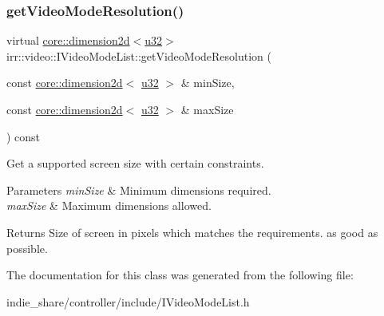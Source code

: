\subsubsection{\texorpdfstring{get\+Video\+Mode\+Resolution()}{getVideoModeResolution()}\hspace{0.1cm}{\footnotesize\ttfamily [4/4]}}
{\footnotesize\ttfamily virtual \hyperlink{classirr_1_1core_1_1dimension2d}{core\+::dimension2d}$<$\hyperlink{namespaceirr_a0416a53257075833e7002efd0a18e804}{u32}$>$ irr\+::video\+::\+I\+Video\+Mode\+List\+::get\+Video\+Mode\+Resolution (\begin{DoxyParamCaption}\item[{const \hyperlink{classirr_1_1core_1_1dimension2d}{core\+::dimension2d}$<$ \hyperlink{namespaceirr_a0416a53257075833e7002efd0a18e804}{u32} $>$ \&}]{min\+Size,  }\item[{const \hyperlink{classirr_1_1core_1_1dimension2d}{core\+::dimension2d}$<$ \hyperlink{namespaceirr_a0416a53257075833e7002efd0a18e804}{u32} $>$ \&}]{max\+Size }\end{DoxyParamCaption}) const\hspace{0.3cm}{\ttfamily [pure virtual]}}



Get a supported screen size with certain constraints. 


\begin{DoxyParams}{Parameters}
{\em min\+Size} & Minimum dimensions required. \\
\hline
{\em max\+Size} & Maximum dimensions allowed. \\
\hline
\end{DoxyParams}
\begin{DoxyReturn}{Returns}
Size of screen in pixels which matches the requirements. as good as possible. 
\end{DoxyReturn}


The documentation for this class was generated from the following file\+:\begin{DoxyCompactItemize}
\item 
indie\+\_\+share/controller/include/I\+Video\+Mode\+List.\+h\end{DoxyCompactItemize}
